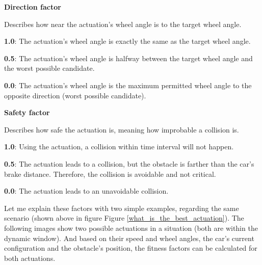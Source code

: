 \begin{minipage}{\textwidth}
\textbf{Direction factor}

Describes how near the actuation's wheel angle is to the target wheel angle.

\textbf{1.0}: The actuation's wheel angle is exactly the same as the target wheel angle.

\textbf{0.5}: The actuation's wheel angle is halfway between the target wheel angle and the worst possible candidate.

\textbf{0.0}: The actuation's wheel angle is the maximum permitted wheel angle to the opposite direction (worst possible candidate).
\end{minipage}

\begin{minipage}{\textwidth}
\textbf{Safety factor}

Describes how safe the actuation is, meaning how improbable a collision is.

\textbf{1.0}: Using the actuation, a collision within time interval will not happen.

\textbf{0.5}: The actuation leads to a collision, but the obstacle is farther than the car's brake distance. Therefore, the collision is avoidable and not critical.

\textbf{0.0}: The actuation leads to an unavoidable collision.
\end{minipage}

Let me explain these factors with two simple examples, regarding the same scenario (shown above in figure Figure \ref{what_is_the_best_actuation}).
The following images show two possible actuations in a situation (both are within the dynamic window). And based on their speed and wheel angles, the car's current configuration and the obstacle's position, the fitness factors can be calculated for both actuations.

